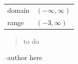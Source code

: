 \documentclass{exam}
\begin{document}
\begin{description}
      \begin{tabular}[H]{ll}
        \toprule
        domain & $(-\infty, \infty)$ \\
        range  & $(-3, \infty)$ \\
        \bottomrule
      \end{tabular}


  \end{description}

\else
  \vspace{6 cm}
  \begin{quote}
    \begin{em}
      to do
    \end{em}
  \end{quote}

  \hspace{1 cm} --author here


\fi
\end{document}
